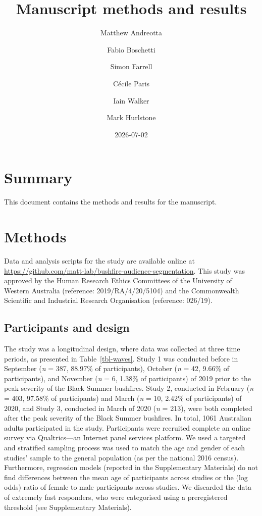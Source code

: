 \documentclass[
  letterpaper,
  DIV=11,
  numbers=noendperiod]{scrartcl}
\title{Manuscript methods and results}
\author{Matthew Andreotta \and Fabio Boschetti \and Simon
Farrell \and Cécile Paris \and Iain Walker \and Mark Hurlstone}
\date{2026-07-02}
\begin{document}
\maketitle


\section{Summary}\label{summary}

This document contains the methods and results for the manuscript.

\section{Methods}\label{methods}

Data and analysis scripts for the study are available online at
\url{https://github.com/matt-lab/bushfire-audience-segmentation}. This
study was approved by the Human Research Ethics Committees of the
University of Western Australia (reference: 2019/RA/4/20/5104) and the
Commonwealth Scientific and Industrial Research Organisation (reference:
026/19).

\subsection{Participants and design}\label{participants-and-design}

The study was a longitudinal design, where data was collected at three
time periods, as presented in Table~\ref{tbl-waves}. Study 1 was
conducted before in September (\textit{n} = 387, 88.97\% of
participants), October (\textit{n} = 42, 9.66\% of participants), and
November (\textit{n} = 6, 1.38\% of participants) of 2019 prior to the
peak severity of the Black Summer bushfires. Study 2, conducted in
February (\textit{n} = 403, 97.58\% of participants) and March
(\textit{n} = 10, 2.42\% of participants) of 2020, and Study 3,
conducted in March of 2020 (\textit{n} = 213), were both completed after
the peak severity of the Black Summer bushfires. In total, 1061
Australian adults participated in the study. Participants were recruited
complete an online survey via Qualtrics---an Internet panel services
platform. We used a targeted and stratified sampling process was used to
match the age and gender of each studies' sample to the general
population (as per the national 2016 census). Furthermore, regression
models (reported in the Supplementary Materials) do not find differences
between the mean age of participants across studies or the (log odds)
ratio of female to male participants across studies. We discarded the
data of extremely fast responders, who were categorised using a
preregistered threshold (see Supplementary Materials).
\end{document}
